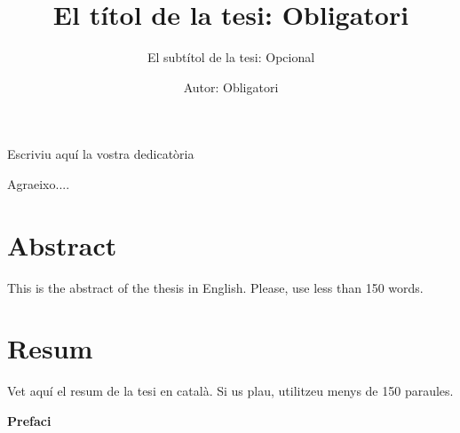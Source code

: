 \documentclass[12pt, a4paper,twoside]{tesi_upf}
\title{El títol de la tesi: Obligatori}
\subtitle{El subtítol de la tesi: Opcional}
\author{Autor: Obligatori}
\begin{document}
\frontmatter

\maketitle

\cleardoublepage



\noindent Escriviu aquí la vostra dedicatòria

\cleardoublepage



 Agraeixo....

\cleardoublepage


\section*{\Large \sffamily Abstract}
This is the abstract of the thesis in English.  Please, use less
than 150 words.

\vspace*{\fill}
\section*{\Large \sffamily  Resum}
Vet aquí el resum de la tesi en català.  Si us plau, utilitzeu
menys de 150 paraules.
\vspace*{\fill}

\cleardoublepage

{\bf Prefaci}

\cleardoublepage


\tableofcontents

\listoffigures

\listoftables

\mainmatter
\end{document}

